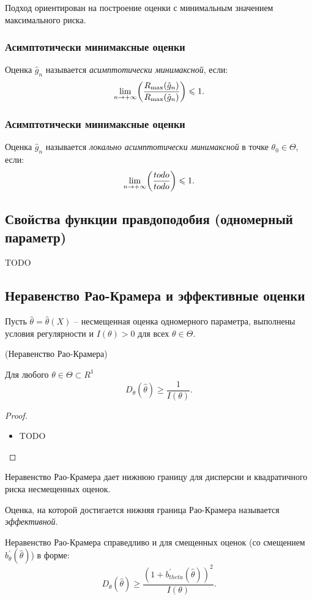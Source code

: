 Подход ориентирован на построение оценки с минимальным значением максимального риска.

\subsubsection{Асимптотически минимаксные оценки}
\begin{definition}
	Оценка $\hat{g}_{n}$ называется \textit{асимптотически минимаксной}, если:
	\[
		\lim_{n \to +\infty}\parens*{\frac{R_{\max}(\hat{g}_n)}{R_{\max}(\tilde{g}_n)}} \leqslant 1
	.\]
\end{definition}

\subsubsection{Асимптотически минимаксные оценки}
\begin{definition}
	Оценка $\hat{g}_{n}$ называется \textit{локально асимптотически минимаксной} в точке $\theta_{0} \in \Theta$, если:
	\[
		\lim_{n \to +\infty}\parens*{\frac{todo}{todo}} \leqslant 1
	.\]
\end{definition}

\subsection{Свойства функции правдоподобия (одномерный параметр)}
TODO

\subsection{Неравенство Рао-Крамера и эффективные оценки}
Пусть $\hat{\theta} = \hat{\theta}(X)$ -- несмещенная оценка одномерного параметра, выполнены условия регулярности и $I(\theta) > 0$ для всех $\theta \in \Theta$.

\begin{theorem}(Неравенство Рао-Крамера)

	Для любого $\theta \in \Theta \subset R^{1}$
	\[
		D_{\theta}(\hat{\theta}) \geqslant \frac{1}{I(\theta)}
	.\]
\end{theorem}
\begin{proof}
	\enewline
        \begin{itemize}
		\item TODO
	\end{itemize}
\end{proof}

Неравенство Рао-Крамера дает нижнюю границу для дисперсии и квадратичного риска несмещенных оценок.

\begin{definition}
	Оценка, на которой достигается нижняя граница Рао-Крамера называется \textit{эффективной}.
\end{definition}

\begin{remark}
	Неравенство Рао-Крамера справедливо и для смещенных оценок (со смещением $b^{'}_{\theta}(\hat{\theta})$) в форме:
	\[
		D_{\theta}(\hat{\theta}) \geqslant \frac{(1 + b^{'}_{theta}(\hat{\theta}))^2}{I(\theta)}
	.\]
\end{remark}

